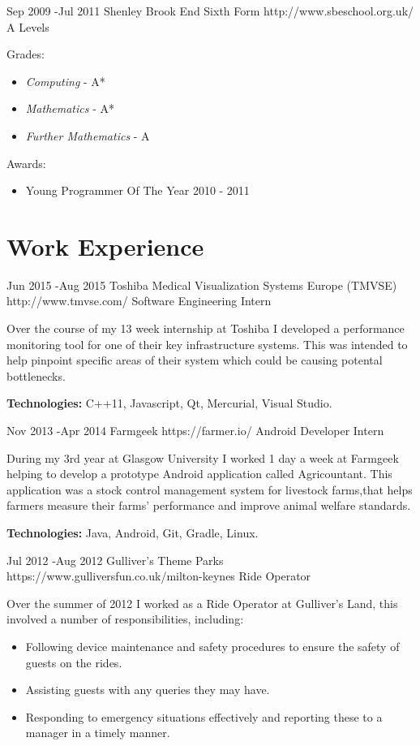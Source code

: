 \documentclass[10pt]{article} %
\begin{document}
\job
{Sep 2009 -}{Jul 2011}
{Shenley Brook End Sixth Form}
{http://www.sbeschool.org.uk/}
{A Levels}
{Grades:
\begin{itemize}[noitemsep]
\item{\textit{Computing} - A*}
\item{\textit{Mathematics} - A*}
\item{\textit{Further Mathematics} - A}
\end{itemize}
Awards:
\begin{itemize}[noitemsep]
\item{Young Programmer Of The Year 2010 - 2011}
\end{itemize}
}


\section{Work Experience}

\job
{Jun 2015 -}{Aug 2015}
{Toshiba Medical Visualization Systems Europe (TMVSE)}
{http://www.tmvse.com/}
{Software Engineering Intern}
{Over the course of my 13 week internship at Toshiba I developed a performance monitoring tool for one of their key infrastructure systems. This was intended to help pinpoint specific areas of their system which could be causing potental bottlenecks.
\\
\rule{0mm}{5mm}\textbf{Technologies:} C++11, Javascript, Qt, Mercurial, Visual Studio.}


\job
{Nov 2013 -}{Apr 2014}
{Farmgeek}
{https://farmer.io/}
{Android Developer Intern}
{During my 3rd year at Glasgow University I worked 1 day a week at Farmgeek helping to develop a prototype Android application called Agricountant. This application was a stock control management system for livestock farms,that helps farmers measure their farms' performance and improve animal welfare standards.
\\
\rule{0mm}{5mm}\textbf{Technologies:} Java, Android, Git, Gradle, Linux.}


\job
{Jul 2012 -}{Aug 2012}
{Gulliver's Theme Parks}
{https://www.gulliversfun.co.uk/milton-keynes}
{Ride Operator}
{Over the summer of 2012 I worked as a Ride Operator at Gulliver's Land, this involved a number of responsibilities, including: 
\begin{itemize}[noitemsep]
\item{Following device maintenance and safety procedures to ensure the safety of guests on the rides.}
\item{Assisting guests with any queries they may have.}
\item{Responding to emergency situations effectively and reporting these to a manager in a timely manner.}
\end{itemize}
}
\end{document}
